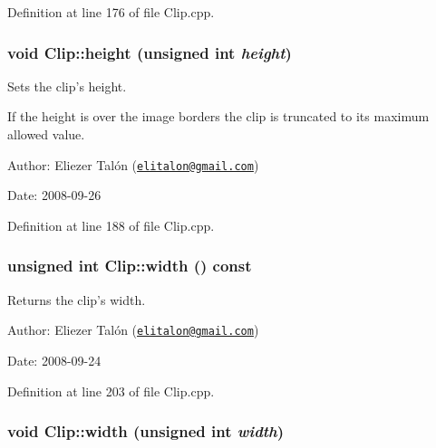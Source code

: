 Definition at line 176 of file Clip.cpp.\hypertarget{class_clip_c6eeb473cb104e6e3f90f4099c7ef741}{
\subsubsection[height]{\setlength{\rightskip}{0pt plus 5cm}void Clip::height (unsigned int {\em height})}}
\label{class_clip_c6eeb473cb104e6e3f90f4099c7ef741}


Sets the clip's height. 

If the height is over the image borders the clip is truncated to its maximum allowed value.

\begin{Desc}
\item[Author:]Eliezer Talón (\href{mailto:elitalon@gmail.com}{\tt elitalon@gmail.com}) \end{Desc}
\begin{Desc}
\item[Date:]2008-09-26 \end{Desc}


Definition at line 188 of file Clip.cpp.\hypertarget{class_clip_d3e816599913e4051e5d50fae17ecd76}{
\subsubsection[width]{\setlength{\rightskip}{0pt plus 5cm}unsigned int Clip::width () const}}
\label{class_clip_d3e816599913e4051e5d50fae17ecd76}


Returns the clip's width. 

\begin{Desc}
\item[Author:]Eliezer Talón (\href{mailto:elitalon@gmail.com}{\tt elitalon@gmail.com}) \end{Desc}
\begin{Desc}
\item[Date:]2008-09-24 \end{Desc}


Definition at line 203 of file Clip.cpp.\hypertarget{class_clip_17c1a23e159bedb6e2988235b8b568e7}{
\subsubsection[width]{\setlength{\rightskip}{0pt plus 5cm}void Clip::width (unsigned int {\em width})}}
\label{class_clip_17c1a23e159bedb6e2988235b8b568e7}


